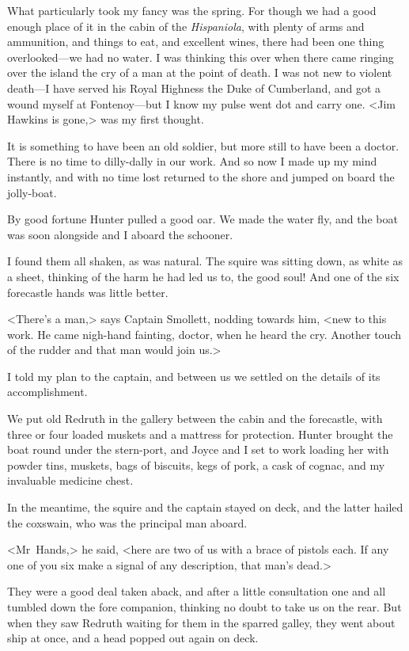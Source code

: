 What particularly took my fancy was the spring. For though we had a good enough place of it in the cabin of the \textit{Hispaniola}, with plenty of arms and ammunition, and things to eat, and excellent wines, there had been one thing overlooked—we had no water. I was thinking this over when there came ringing over the island the cry of a man at the point of death. I was not new to violent death—I have served his Royal Highness the Duke of Cumberland, and got a wound myself at Fontenoy—but I know my pulse went dot and carry one. <Jim Hawkins is gone,> was my first thought.

It is something to have been an old soldier, but more still to have been a doctor. There is no time to dilly-dally in our work. And so now I made up my mind instantly, and with no time lost returned to the shore and jumped on board the jolly-boat.

By good fortune Hunter pulled a good oar. We made the water fly, and the boat was soon alongside and I aboard the schooner.

I found them all shaken, as was natural. The squire was sitting down, as white as a sheet, thinking of the harm he had led us to, the good soul! And one of the six forecastle hands was little better.

<There's a man,> says Captain Smollett, nodding towards him, <new to this work. He came nigh-hand fainting, doctor, when he heard the cry. Another touch of the rudder and that man would join us.>

I told my plan to the captain, and between us we settled on the details of its accomplishment.

We put old Redruth in the gallery between the cabin and the forecastle, with three or four loaded muskets and a mattress for protection. Hunter brought the boat round under the stern-port, and Joyce and I set to work loading her with powder tins, muskets, bags of biscuits, kegs of pork, a cask of cognac, and my invaluable medicine chest.

In the meantime, the squire and the captain stayed on deck, and the latter hailed the coxswain, who was the principal man aboard.

<Mr~Hands,> he said, <here are two of us with a brace of pistols each. If any one of you six make a signal of any description, that man's dead.>

They were a good deal taken aback, and after a little consultation one and all tumbled down the fore companion, thinking no doubt to take us on the rear. But when they saw Redruth waiting for them in the sparred galley, they went about ship at once, and a head popped out again on deck.


